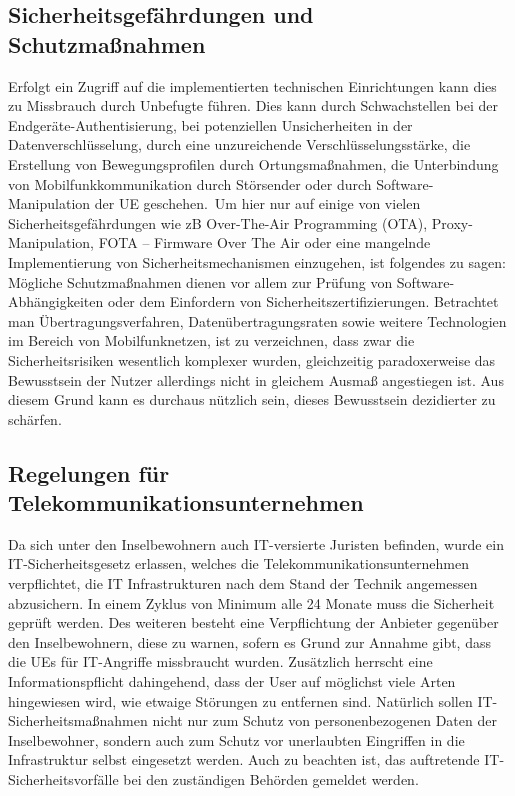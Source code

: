 \subsection{Sicherheitsgefährdungen und Schutzmaßnahmen}
Erfolgt ein Zugriff auf die implementierten technischen Einrichtungen kann dies zu Missbrauch durch Unbefugte führen. Dies kann durch Schwachstellen bei der Endgeräte-Authentisierung, bei potenziellen Unsicherheiten in der Datenverschlüsselung, durch eine unzureichende Verschlüsselungsstärke, die Erstellung von Bewegungsprofilen durch Ortungsmaßnahmen, die Unterbindung von Mobilfunkkommunikation durch Störsender oder durch Software-Manipulation der UE geschehen.\ Um hier nur auf einige von vielen Sicherheitsgefährdungen wie zB Over-The-Air Programming (OTA), Proxy-Manipulation, FOTA – Firmware Over The Air oder eine mangelnde Implementierung von Sicherheitsmechanismen  einzugehen, ist folgendes zu sagen: Mögliche Schutzmaßnahmen dienen vor allem zur Prüfung von Software-Abhängigkeiten oder dem Einfordern von Sicherheitszertifizierungen. 
Betrachtet man Übertragungsverfahren, Datenübertragungsraten sowie weitere Technologien im Bereich von Mobilfunknetzen, ist zu verzeichnen, dass zwar die Sicherheitsrisiken wesentlich komplexer wurden, gleichzeitig paradoxerweise das Bewusstsein der Nutzer allerdings nicht in gleichem Ausmaß angestiegen ist. Aus diesem Grund kann es durchaus nützlich sein, dieses Bewusstsein dezidierter zu schärfen\cite{Ger08}.

\subsection{Regelungen für Telekommunikationsunternehmen}

Da sich unter den Inselbewohnern auch IT-versierte Juristen befinden, wurde ein IT-Sicherheitsgesetz erlassen, welches die Telekommunikationsunternehmen verpflichtet, die IT Infrastrukturen nach dem Stand der Technik angemessen abzusichern. In einem Zyklus von Minimum alle 24 Monate muss die Sicherheit geprüft werden.
Des weiteren besteht eine Verpflichtung der Anbieter gegenüber den Inselbewohnern, diese zu warnen, sofern es Grund zur Annahme gibt, dass die UEs für IT-Angriffe missbraucht wurden. Zusätzlich herrscht eine Informationspflicht dahingehend, dass der User auf möglichst viele Arten hingewiesen wird, wie etwaige Störungen zu entfernen sind.
Natürlich sollen IT-Sicherheitsmaßnahmen nicht nur zum Schutz von personenbezogenen Daten der Inselbewohner, sondern auch zum Schutz vor unerlaubten Eingriffen in die Infrastruktur selbst eingesetzt werden.
Auch zu beachten ist, das auftretende IT-Sicherheitsvorfälle bei den zuständigen Behörden gemeldet werden.\cite{BSI17}  